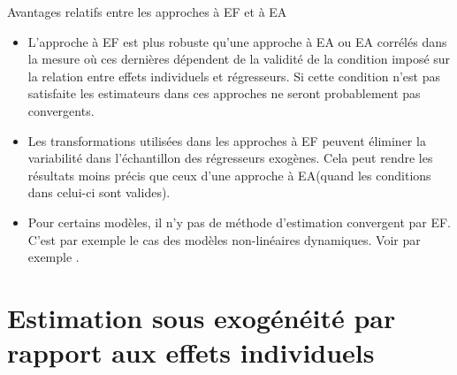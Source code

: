 \begin{frame}[allowframebreaks]{Avantages relatifs entre les approches à EF et à EA}
    \begin{itemize}
        \item L'approche à EF est plus robuste qu'une approche à EA ou EA corrélés
         dans la mesure où ces dernières dépendent de la validité de la 
         condition imposé sur la relation entre effets individuels et régresseurs.
          Si cette condition n'est pas satisfaite 
          les estimateurs dans ces approches  ne seront probablement pas convergents.
          \item Les transformations utilisées dans les approches à EF peuvent éliminer 
          la variabilité dans l'échantillon des régresseurs exogènes. 
          Cela peut rendre les résultats moins précis que ceux d'une approche à EA(quand les conditions dans 
          celui-ci sont valides). 
          \item Pour certains modèles, il n'y pas de méthode d'estimation convergent par EF. 
          C'est par exemple le cas des modèles non-linéaires dynamiques. Voir par exemple \cite{Chamberlain2010}.
    \end{itemize}
\end{frame}

\section{Estimation sous exogénéité par rapport aux effets individuels}
\frame{\sectionpage}

